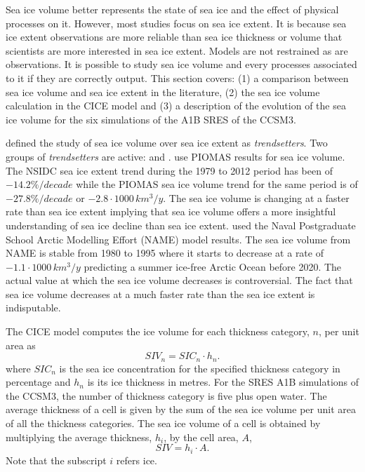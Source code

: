 Sea ice volume better represents the state of sea ice and the effect of physical processes on it. However, most studies focus on sea ice extent. It is because sea ice extent observations are more reliable than sea ice thickness or volume that scientists are more interested in sea ice extent. Models are not restrained as are observations. It is possible to study sea ice volume and every processes associated to it if they are correctly output. This section covers: (1) a comparison between sea ice volume and sea ice extent in the literature, (2) the sea ice volume calculation in the CICE model and (3) a description of the evolution of the sea ice volume for the six simulations of the A1B SRES of the CCSM3.

\citet{overland2013} defined the study of sea ice volume over sea ice extent as \textit{trendsetters}. Two groups of \textit{trendsetters} are active: \citet{schweiger2011} and \citet{Maslowski2012Fu}. \citet{schweiger2011} use PIOMAS results for sea ice volume. The NSIDC sea ice extent trend during the 1979 to 2012 period has been of $-14.2\%/decade$ while the PIOMAS sea ice volume trend for the same period is of $-27.8\%/decade$ or $-2.8\cdot 1000\, km^3 /y$. The sea ice volume is changing at a faster rate than sea ice extent implying that sea ice volume offers a more insightful understanding of sea ice decline than sea ice extent. \citet{Maslowski2012Fu} used the Naval Postgraduate School Arctic Modelling Effort (NAME) model \citep{maslowski2004} results. The sea ice volume from NAME is stable from 1980 to 1995 where it starts to decrease at a rate of $-1.1 \cdot 1000\, km^3 /y$  predicting a summer ice-free Arctic Ocean before 2020. The actual value at which the sea ice volume decreases is controversial. The fact that sea ice volume decreases at a much faster rate than the sea ice extent is indisputable.

The CICE model computes the ice volume for each thickness category, $n$, per unit area as \citep{Hunke:2008ly}
\begin{equation}
SIV_n = SIC_n\cdot h_n. 
\end{equation}
where $SIC_n$ is the sea ice concentration for the specified thickness category in percentage and $h_n$ is its ice thickness in metres. For the SRES A1B simulations of the CCSM3, the number of thickness category is five plus open water. The average thickness of a cell is given by the sum of the sea ice volume per unit area of all the thickness categories. The sea ice volume of a cell is obtained by multiplying the average thickness, $h_i$, by the cell area, $A$,
\begin{equation}
SIV = h_i \cdot A. 
\end{equation}
Note that the subscript $i$ refers ice. 

